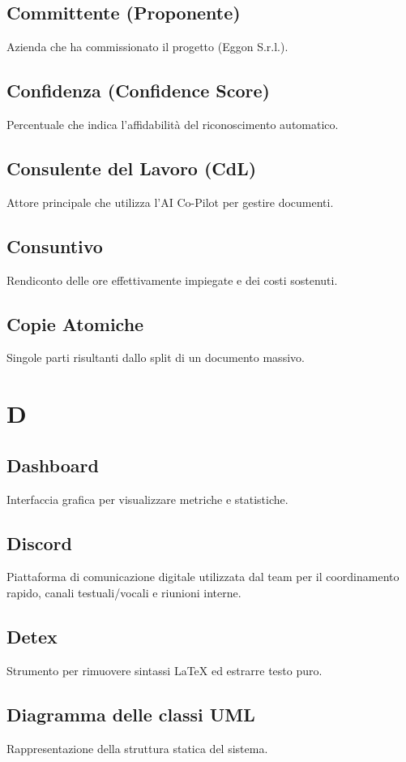 \documentclass[a4paper,12pt]{article}
\begin{document}
\subsection{Committente (Proponente)}
Azienda che ha commissionato il progetto (Eggon S.r.l.).

\subsection{Confidenza (Confidence Score)}
Percentuale che indica l'affidabilità del riconoscimento automatico.

\subsection{Consulente del Lavoro (CdL)}
Attore principale che utilizza l'AI Co-Pilot per gestire documenti.

\subsection{Consuntivo}
Rendiconto delle ore effettivamente impiegate e dei costi sostenuti.

\subsection{Copie Atomiche}
Singole parti risultanti dallo split di un documento massivo.

\section{D}
\subsection{Dashboard}
Interfaccia grafica per visualizzare metriche e statistiche.

\subsection{Discord}
Piattaforma di comunicazione digitale utilizzata dal team per il coordinamento rapido, canali testuali/vocali e riunioni interne.

\subsection{Detex}
Strumento per rimuovere sintassi LaTeX ed estrarre testo puro.

\subsection{Diagramma delle classi UML}
Rappresentazione della struttura statica del sistema.
\end{document}
